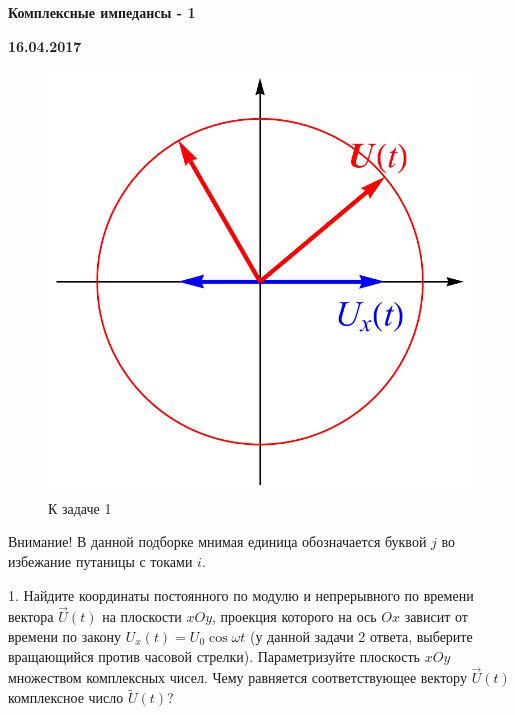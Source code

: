 \documentclass[14pt]{article}
\begin{document}
\begin{center}
\Large{\textbf{Комплексные импедансы - 1}}

\textbf{16.04.2017}

\vspace{5mm}
\end{center}

\begin{figure}
\begin{center}
\vspace{-5mm}
\includegraphics[scale=0.35]{impedance1.pdf}
\caption{\hspace{-2.5mm}К задаче 1}
\end{center}
\vspace{-6mm}
\end{figure}

Внимание! В данной подборке мнимая единица обозначается буквой $j$ во избежание путаницы с токами $i$.

1. Найдите координаты постоянного по модулю и непрерывного по времени вектора $\vec{U}(t)$ на плоскости $xOy$, проекция которого на ось $Ox$ зависит от времени по закону $U_x(t)=U_0\cos\omega t$ (у данной задачи 2 ответа, выберите вращающийся против часовой стрелки). Параметризуйте плоскость $xOy$ множеством комплексных чисел. Чему равняется соответствующее вектору $\vec{U}(t)$ комплексное число $\tilde{U}(t)$?
\end{document}
